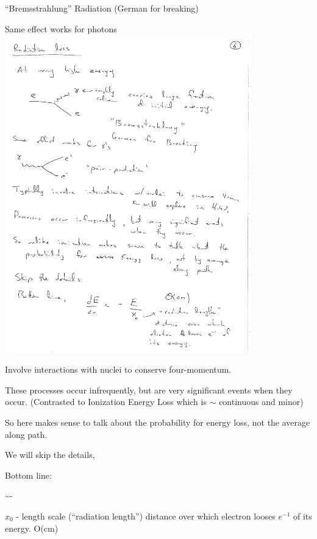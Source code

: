 {``Bremsstrahlung'' Radiation (German for breaking)


Same effect works for photons
\bc
\includegraphics[width=0.8\textwidth]{./PairProduction.pdf}
\ec

Involve interactions with nuclei to conserve four-momentum.


These processes occur infrequently, but are very significant events when they occur.
(Contrasted to Ionization Energy Loss which is $\sim$ continuous and minor)

So here makes sense to talk about the probability for energy loss, not the average along path.

We will skip the details, 

Bottom line:

\be
{} \sim - 
\ee

$x_0$ - length scale (``radiation length'') distance over which electron looses $e^{-1}$ of its energy. O(cm)


}
